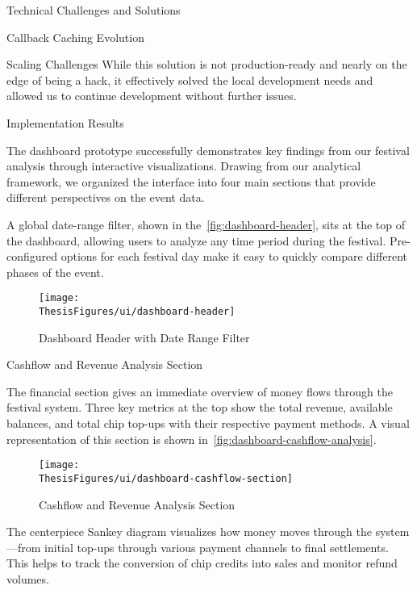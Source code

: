 \begin{section}{Technical Challenges and Solutions}
\begin{subsection}{Callback Caching Evolution}
\begin{subsubsection}{Scaling Challenges}
			While this solution is not production-ready and nearly on the edge of being a hack, it effectively solved the local development needs and allowed us to continue development without further issues.
		\end{subsubsection}
	\end{subsection}
\end{section}

\begin{section}{Implementation Results}
	\label{sec:implementation-results}

	The dashboard prototype successfully demonstrates key findings from our festival analysis through interactive visualizations.
	Drawing from our analytical framework, we organized the interface into four main sections that provide different perspectives on the event data.

	A global date-range filter, shown in the~\autoref{fig:dashboard-header}, sits at the top of the dashboard, allowing users to analyze any time period during the festival.
	Pre-configured options for each festival day make it easy to quickly compare different phases of the event.

	\begin{figure}[H]
		\centering
		\texttt{[image: \\ThesisFigures/ui/dashboard-header]}
		\caption{Dashboard Header with Date Range Filter}
		\label{fig:dashboard-header}
		\source
	\end{figure}

	\begin{subsection}{Cashflow and Revenue Analysis Section}
		\label{subsec:implementation-results-structure-cashflow}

		The financial section gives an immediate overview of money flows through the festival system.
		Three key metrics at the top show the total revenue, available balances, and total chip top-ups with their respective payment methods.
		A visual representation of this section is shown in~\autoref{fig:dashboard-cashflow-analysis}.

		\begin{figure}[h]
			\centering
			\texttt{[image: \\ThesisFigures/ui/dashboard-cashflow-section]}
			\caption{Cashflow and Revenue Analysis Section}
			\source
			\label{fig:dashboard-cashflow-analysis}
		\end{figure}

		The centerpiece Sankey diagram visualizes how money moves through the system—from initial top-ups through various payment channels to final settlements.
		This helps to track the conversion of chip credits into sales and monitor refund volumes.


\end{subsection}
\end{section}
